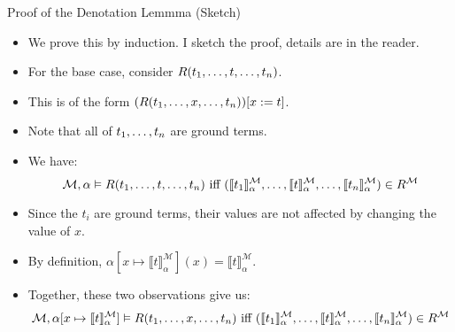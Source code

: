 \documentclass[../slides.tex]{subfiles}
\begin{document}
\begin{frame}{Proof of the Denotation Lemmma (Sketch)}

  \begin{itemize}

  \item We prove this by induction. I sketch the proof, details are in
    the reader.

   \item For the base case, consider $R(t_1, \mathellipsis, t,
     \mathellipsis, t_n)$.

     \item This is of the form $(R(t_1, \mathellipsis,x, \mathellipsis,
       t_n))[x:=t]$.

       \item Note that all of $t_1, \mathellipsis, t_n$ are ground
         terms.

         \item We have: {\small\[\mathcal{M},\alpha\vDash R(t_1,
               \mathellipsis, t, 
               \mathellipsis, t_n)\text{ iff }(\llbracket
                t_1\rrbracket^\mathcal{M}_\alpha,\mathellipsis,
                \llbracket
                t\rrbracket^\mathcal{M}_\alpha,\mathellipsis,\llbracket
                t_n\rrbracket^\mathcal{M}_\alpha)\in
                R^\mathcal{M}\]}

            \item Since the $t_i$ are ground terms, their values are
              not affected by changing the value of $x$.

              \item By definition, $\alpha[x\mapsto \llbracket
                t\rrbracket^\mathcal{M}_\alpha](x)=\llbracket
                t\rrbracket^\mathcal{M}_\alpha$.

              \item Together, these two observations give us:
                 {\scriptsize\[\mathcal{M},\alpha[x\mapsto \llbracket
                t\rrbracket^\mathcal{M}_\alpha]\vDash R(t_1,
               \mathellipsis, x, 
               \mathellipsis, t_n)\text{ iff }(\llbracket
                t_1\rrbracket^\mathcal{M}_\alpha,\mathellipsis,
                \llbracket
                t\rrbracket^\mathcal{M}_\alpha,\mathellipsis,\llbracket
                t_n\rrbracket^\mathcal{M}_\alpha)\in
                R^\mathcal{M}\]}
            
  \end{itemize}
  
\end{frame}
\end{document}
